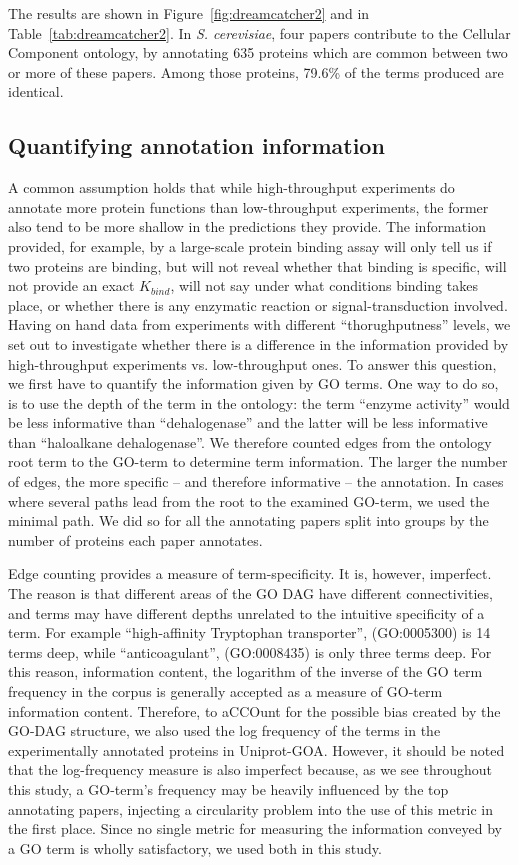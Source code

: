 \documentclass[12pt]{article}
\begin{document}
The results are shown in Figure~\ref{fig:dreamcatcher2} and in
Table~\ref{tab:dreamcatcher2}. In \textit{S.  cerevisiae}, four papers contribute to the
Cellular Component ontology, by annotating 635 proteins which are common between two or more
of these papers. Among those proteins,  79.6\% of the terms produced are identical.

\subsection*{Quantifying annotation information}

A common assumption holds that while high-throughput experiments do annotate more protein
functions than low-throughput experiments, the former also tend to be more shallow in the
predictions they provide. The information provided, for example, by a large-scale protein
binding assay will only tell us if two proteins are binding, but will not reveal whether
that binding is specific, will not provide an exact $K_{bind}$, will not say under what
conditions binding takes place, or whether there is any enzymatic reaction or
signal-transduction involved. Having on hand data from experiments with different
``thorughputness'' levels,  we set out to investigate whether there is a difference in the
information provided by high-throughput experiments vs. low-throughput ones. To answer this
question, we first have to quantify the information given by GO terms. One way to do so, is
to use the depth of the term in the ontology: the term ``enzyme activity'' would be less
informative than ``dehalogenase'' and the latter will be less informative than ``haloalkane
dehalogenase''.  We therefore counted edges from the ontology root term to the GO-term to
determine term information. The larger the number of edges, the more specific -- and
therefore informative -- the annotation. In cases where several paths lead from the root to
the examined GO-term, we used the minimal path. We did so for all the annotating papers
split into groups by the number of proteins each paper annotates. 


Edge counting provides a measure of term-specificity. It is, however, imperfect. The reason is
that different areas of the GO DAG have different connectivities, and terms may have different
depths unrelated to the intuitive specificity of a term. For example ``high-affinity
Tryptophan transporter'', (GO:0005300) is 14 terms deep, while ``anticoagulant'', (GO:0008435)
is only three terms deep.  For this reason, information content, the logarithm of the inverse
of the GO term frequency in the corpus is generally accepted as a measure of GO-term
information content\cite{lord-semsim}. Therefore, to aCCOunt for the possible bias created by
the GO-DAG structure, we also used the log frequency of the terms in the experimentally
annotated proteins in Uniprot-GOA. However, it should be noted that the log-frequency measure
is also imperfect because, as we see throughout this study, a GO-term's frequency may be
heavily influenced  by the top annotating papers, injecting a circularity problem into the use
of this metric in the first place.
Since no single metric for measuring the information
conveyed by a GO term is wholly satisfactory, we used both in this study.
\end{document}
